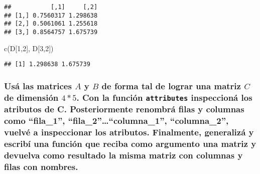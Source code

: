 \documentclass[
]{article}
\newenvironment{Shaded}{\begin{snugshade}}{\end{snugshade}}
\newcommand{\DecValTok}[1]{\textcolor[rgb]{0.00,0.00,0.81}{#1}}
\newcommand{\FunctionTok}[1]{\textcolor[rgb]{0.00,0.00,0.00}{#1}}
\newcommand{\NormalTok}[1]{#1}
\begin{document}
\begin{verbatim}
##           [,1]     [,2]
## [1,] 0.7560317 1.298638
## [2,] 0.5061061 1.255618
## [3,] 0.8564757 1.675739
\end{verbatim}

\begin{Shaded}
\begin{Highlighting}[]
\FunctionTok{c}\NormalTok{(D[}\DecValTok{1}\NormalTok{,}\DecValTok{2}\NormalTok{], D[}\DecValTok{3}\NormalTok{,}\DecValTok{2}\NormalTok{])}
\end{Highlighting}
\end{Shaded}

\begin{verbatim}
## [1] 1.298638 1.675739
\end{verbatim}

\hypertarget{usuxe1-las-matrices-a-y-b-de-forma-tal-de-lograr-una-matriz-c-de-dimensiuxf3n-45.-con-la-funciuxf3n-attributes-inspeccionuxe1-los-atributos-de-c.-posteriormente-renombruxe1-filas-y-columnas-como-fila_1-fila_2columna_1-columna_2-vuelvuxe9-a-inspeccionar-los-atributos.-finalmente-generalizuxe1-y-escribuxed-una-funciuxf3n-que-reciba-como-argumento-una-matriz-y-devuelva-como-resultado-la-misma-matriz-con-columnas-y-filas-con-nombres.}{%
\subsubsection{\texorpdfstring{Usá las matrices \(A\) y \(B\) de forma
tal de lograr una matriz \(C\) de dimensión \(4*5\). Con la función
\texttt{attributes} inspeccioná los atributos de C. Posteriormente
renombrá filas y columnas como ``fila\_1'',
``fila\_2''\ldots{}``columna\_1'', ``columna\_2'', vuelvé a inspeccionar
los atributos. Finalmente, generalizá y escribí una función que reciba
como argumento una matriz y devuelva como resultado la misma matriz con
columnas y filas con
nombres.}{Usá las matrices A y B de forma tal de lograr una matriz C de dimensión 4*5. Con la función attributes inspeccioná los atributos de C. Posteriormente renombrá filas y columnas como ``fila\_1'', ``fila\_2''\ldots``columna\_1'', ``columna\_2'', vuelvé a inspeccionar los atributos. Finalmente, generalizá y escribí una función que reciba como argumento una matriz y devuelva como resultado la misma matriz con columnas y filas con nombres.}}\label{usuxe1-las-matrices-a-y-b-de-forma-tal-de-lograr-una-matriz-c-de-dimensiuxf3n-45.-con-la-funciuxf3n-attributes-inspeccionuxe1-los-atributos-de-c.-posteriormente-renombruxe1-filas-y-columnas-como-fila_1-fila_2columna_1-columna_2-vuelvuxe9-a-inspeccionar-los-atributos.-finalmente-generalizuxe1-y-escribuxed-una-funciuxf3n-que-reciba-como-argumento-una-matriz-y-devuelva-como-resultado-la-misma-matriz-con-columnas-y-filas-con-nombres.}}
\end{document}
